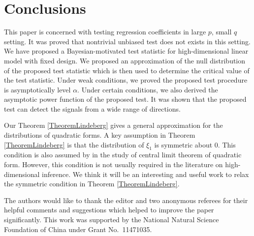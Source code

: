 \documentclass[smallextended]{svjour3}       %
\begin{document}
\section{Conclusions}\label{sec:conclusions}
This paper is concerned with testing regression coefficients in large $p$, small $q$ setting.
It was proved that nontrivial unbiased test does not exists in this setting.
We have proposed a Bayesian-motivated test statistic for high-dimensional linear model with fixed design.
We proposed an approximation of the null distribution of the proposed test statistic which is then used to determine the critical value of the test statistic.
Under weak conditions, we proved the proposed test procedure is asymptotically level $\alpha$.
Under certain conditions, we also derived the asymptotic power function of the proposed test.
It was shown that the proposed test can detect the signals from a wide range of directions.

%
Our Theorem \ref{TheoremLindeberg} gives a general approximation for the distributions of quadratic forms.
A key assumption in Theorem \ref{TheoremLindeberg} is that the distribution of $\xi_1$ is symmetric about $0$. 
This condition is also assumed by \cite{Bai2017} in the study of central limit theorem of quadratic form.
However, this condition is not usually required in the literature on high-dimensional inference.
We think it will be an interesting and useful work to relax the symmetric condition in Theorem \ref{TheoremLindeberg}.






\begin{acknowledgements}
    The authors would like to thank the editor and two anonymous referees for their helpful comments and suggestions which helped to improve the paper significantly.
This work was supported by the National Natural Science Foundation of China under Grant No.\ 11471035.
\end{acknowledgements}
\end{document}
